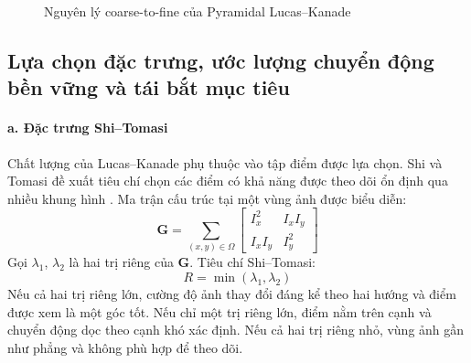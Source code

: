 \documentclass[../DoAn.tex]{subfiles}
\begin{document}
\begin{figure}[htbp]
    \caption{Nguyên lý coarse-to-fine của Pyramidal Lucas--Kanade}
    \label{fig:pyramidal_lucas_kanade}
\end{figure}

\subsection{Lựa chọn đặc trưng, ước lượng chuyển động bền vững và tái bắt mục tiêu}

\paragraph{a. Đặc trưng Shi--Tomasi}
Chất lượng của Lucas--Kanade phụ thuộc vào tập điểm được lựa chọn. Shi và Tomasi đề xuất tiêu chí chọn các điểm có khả năng được theo dõi ổn định qua nhiều khung hình \cite{shi_tomasi1994}. Ma trận cấu trúc tại một vùng ảnh được biểu diễn:
\[
\boldsymbol{G} = \sum_{(x,y)\in\Omega}
\begin{bmatrix}
I_x^2 & I_xI_y \\
I_xI_y & I_y^2
\end{bmatrix}
\]
Gọi $\lambda_1$, $\lambda_2$ là hai trị riêng của $\boldsymbol{G}$. Tiêu chí Shi--Tomasi:
\[
R = \min(\lambda_1, \lambda_2)
\]
Nếu cả hai trị riêng lớn, cường độ ảnh thay đổi đáng kể theo hai hướng và điểm được xem là một góc tốt. Nếu chỉ một trị riêng lớn, điểm nằm trên cạnh và chuyển động dọc theo cạnh khó xác định. Nếu cả hai trị riêng nhỏ, vùng ảnh gần như phẳng và không phù hợp để theo dõi.
\end{document}

